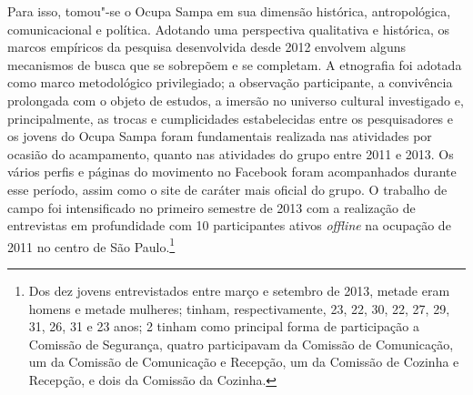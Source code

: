 Para isso, tomou"-se o Ocupa Sampa em sua dimensão histórica,
antropológica, comunicacional e política. Adotando uma perspectiva
qualitativa e histórica, os marcos empíricos da pesquisa desenvolvida
desde 2012 envolvem alguns mecanismos de busca que se sobrepõem e se
completam. A etnografia foi adotada como marco metodológico
privilegiado; a observação participante, a convivência prolongada com o
objeto de estudos, a imersão no universo cultural investigado e,
principalmente, as trocas e cumplicidades estabelecidas entre os
pesquisadores e os jovens do Ocupa Sampa foram fundamentais realizada
nas atividades por ocasião do acampamento, quanto nas atividades do
grupo entre 2011 e 2013. Os vários perfis e páginas do movimento no
Facebook foram acompanhados durante esse período, assim como o site de
caráter mais oficial do grupo. O trabalho de campo foi intensificado no
primeiro semestre de 2013 com a realização de entrevistas em
profundidade com 10 participantes ativos \textit{offline} na ocupação
de 2011 no centro de São Paulo.\footnote{Dos dez jovens entrevistados entre março e setembro de 2013, metade eram homens e metade mulheres; tinham, respectivamente, 23, 22, 30, 22, 27, 29, 31, 26, 31 e 23 anos; 2 tinham como principal forma de participação a Comissão de Segurança, quatro participavam da Comissão de Comunicação, um da 
Comissão de Comunicação e Recepção, um da Comissão de Cozinha e Recepção, e dois da
Comissão da Cozinha.}

